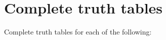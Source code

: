 

\chapter{Complete truth tables}\label{s:CompleteTruthTables}
\setcounter{ProbPart}{0}

\problempart
\label{pr.TT.TTorC}
Complete truth tables for each of the following:
